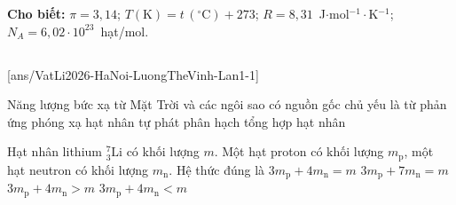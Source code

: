 \newcommand{\LTVhat}[3]{%
	\if#3p\filldraw[fill=VLdo!85!black,draw=black,thin] (#1,#2) circle (0.15);\node[white,inner sep=0pt,font=\fontsize{6}{6}\selectfont] at (#1,#2) {p$^{+}$};\fi
	\if#3n\filldraw[fill=black!75,draw=black,thin] (#1,#2) circle (0.15);\node[white,inner sep=0pt,font=\fontsize{6}{6}\selectfont] at (#1,#2) {n$^{0}$};\fi
	\if#3e\filldraw[fill=VLxanh!80!black,draw=black,thin] (#1,#2) circle (0.15);\node[white,inner sep=0pt,font=\fontsize{6}{6}\selectfont] at (#1,#2) {e$^{-}$};\fi}
\newcommand{\LTVkhungpV}{%
	\draw[gray!55,densely dashed,thin] (0,0) grid[step=1] (5,5);
	\draw[VLmui,thick] (0,0)--(6.2,0) node[right,inner sep=1pt] {$V$ (l)};
	\draw[VLmui,thick] (0,0)--(0,6.1) node[right,inner sep=2pt] {$p$ (atm)};
	\node[below left,inner sep=1.5pt] at (0,0) {O};
	\node[below,inner sep=2pt] at (1,0) {$1$};
	\node[below,inner sep=2pt] at (4,0) {$4$};
	\node[left,inner sep=2pt] at (0,1) {$1$};
	\node[left,inner sep=2pt] at (0,4) {$4$};}


	\noindent\textbf{Cho biết:} $\pi=3{,}14$; $T(\text{K})=t\,(^\circ\text{C})+273$; $R=8{,}31$~J$\cdot$mol$^{-1}\cdot$K$^{-1}$; $N_A=6{,}02\cdot 10^{23}$~hạt/mol.

	\noindent
	\subsection*{}
	\setcounter{ex}{0}
	[ans/VatLi2026-HaNoi-LuongTheVinh-Lan1-1]

	\begin{ex}%
		Năng lượng bức xạ từ Mặt Trời và các ngôi sao có nguồn gốc chủ yếu là từ phản ứng
		\choice
		{phóng xạ}
		{hạt nhân tự phát}
		{phân hạch}
		{\True tổng hợp hạt nhân}
	\end{ex}

	\begin{ex}%
		Hạt nhân lithium ${}^7_3\text{Li}$ có khối lượng $m$. Một hạt proton có khối lượng $m_\text{p}$, một hạt neutron có khối lượng $m_\text{n}$. Hệ thức đúng là
		\choice
		{$3m_\text{p}+4m_\text{n}=m$}
		{$3m_\text{p}+7m_\text{n}=m$}
		{\True $3m_\text{p}+4m_\text{n}>m$}
		{$3m_\text{p}+4m_\text{n}<m$}
	\end{ex}

